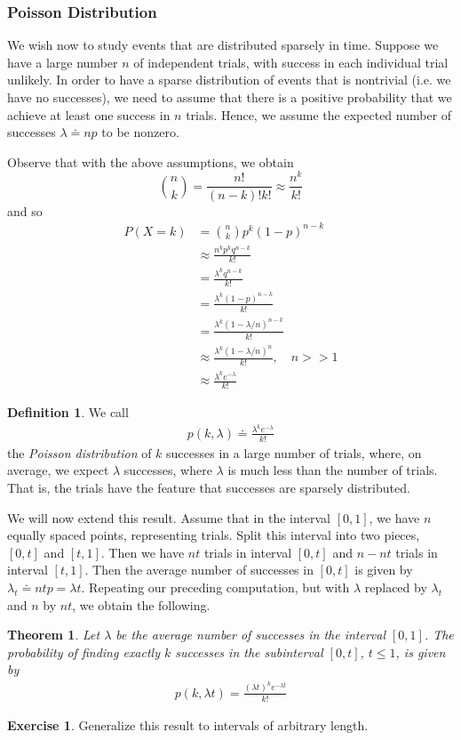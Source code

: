 \documentclass[12pt]{article}
\theoremstyle{plain}
\newtheorem{theorem}{Theorem}
\theoremstyle{definition}
\newtheorem*{definition}{Definition}
\newtheorem*{exercise}{Exercise}
\theoremstyle{remark}
\numberwithin{equation}{section}  %
\begin{document}
\subsubsection{Poisson Distribution}
We wish now to study events that are distributed sparsely in time.
Suppose we have a large number $n$ of independent trials, with
success in each individual trial unlikely. In order to have a sparse
distribution of events that is nontrivial (i.e. we have no successes),
we need to assume that there is a positive
probability that we achieve at least one success in $n$ trials. Hence, we assume the expected number of
successes $\lambda \doteq np$ to be nonzero.

Observe that with the above assumptions, we obtain
\begin{equation*}
\binom{n}{k} = \frac{n!}{(n-k)! k!} \approx \frac{n^k}{k!}
\end{equation*}
and so
\begin{align*}
P(X = k)
& = \binom{n}{k} p^k (1 - p)^{n-k} \\
& \approx \frac{n^k p^k q^{n-k}}{k!} \\
& = \frac{\lambda^k q^{n-k}}{k!} \\
& = \frac{\lambda^k (1-p)^{n-k}}{k!} \\
& = \frac{\lambda^k (1-\lambda/n)^{n-k}}{k!} \\
& \approx \frac{\lambda^k (1-\lambda/n)^{n}}{k!} , \quad n >> 1\\
& \approx \frac{\lambda^k e^{-\lambda}}{k!}
\end{align*}
\begin{definition}
We call
\begin{align*}
p(k, \lambda) \doteq \frac{\lambda^k e^{-\lambda}}{k!}
\end{align*}
the \emph{Poisson distribution} of $k$ successes in a large number
of trials, where, on average, we expect $\lambda$ successes,
where $\lambda$ is much less than the number of trials.
That is, the trials have the feature that successes are
sparsely distributed.
\end{definition}
We will now extend this result. Assume that in the interval $[0,1]$,
we have $n$ equally spaced points, representing trials. Split this interval into two pieces,
$[0,t]$ and $[t, 1]$. Then we have $nt$ trials in interval $[0,t]$ and
$n - nt$ trials in interval $[t,1]$. Then the average number of successes
in $[0,t]$ is given by $\lambda_t \doteq n t p = \lambda t$. Repeating
our preceding computation, but with $\lambda$ replaced by $\lambda_t$
and $n$ by $nt$, we obtain the following.
\begin{theorem}
Let $\lambda$ be the average number of successes in the interval $[0,1]$.
The probability of finding exactly $k$ successes  in the subinterval $[0,t]$,
$t \le 1$, is given by
\begin{align*}
p(k, \lambda t) = \frac{ (\lambda t)^{k} e^{-\lambda t}}{k!}
\end{align*}
\end{theorem}
\begin{exercise}
Generalize this result to intervals of arbitrary length.
\end{exercise}
\end{document}
